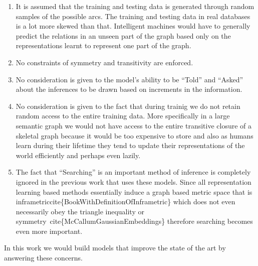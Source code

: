 \documentclass[12pt]{exam} %
\renewcommand{\cite}[1]{cite\{#1\}}
\begin{document}
\begin{questions}
{    \begin{enumerate}
    \item It is assumed that the training and testing data is
      generated through random samples of the possible arcs. The
      training and testing data in real databases is a lot more skewed
      than that. Intelligent machines would have to generally predict
      the relations in an unseen part of the graph based only on the
      representations learnt to represent one part of the graph.
    \item No constraints of symmetry and transitivity are enforced.
    \item No consideration is given to the model's ability to be
      ``Told'' and ``Asked'' about the inferences to be drawn based on
      increments in the information.
    \item No consideration is given to the fact that during trainig we
      do not retain random access to the entire training data. More
      specifically in a large semantic graph we would not have access
      to the entire transitive closure of a skeletal graph because it
      would be too expensive to store and also as humans learn during
      their lifetime they tend to update their representations of the
      world efficiently and perhaps even lazily.
    \item The fact that ``Searching'' is an important method of
      inference is completely ignored in the previous work that uses
      these models. Since all representation learning based methods
      essentially induce a graph based metric space that is
      inframetric\cite{BookWithDefinitionOfInframetric} which does not
      even necessarily obey the triangle inequality or
      symmetry~\cite{McCallumGaussianEmbeddings} therefore searching
      becomes even more important.
    \end{enumerate}

    In this work we would build models that improve the state of the
    art by answering these concerns.  }



\end{questions}
\end{document}
